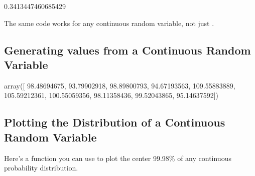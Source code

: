 \documentclass[letterpaper,10pt,english]{jupyterBook}
\begin{document}
\begin{sphinxVerbatim}[commandchars=\\\{\}]
0.3413447460685429
\end{sphinxVerbatim}

\sphinxAtStartPar
The same code works for any continuous random variable, not just .


\subsection{Generating values from a Continuous Random Variable}
\label{\detokenize{GB213-review-in-Python:generating-values-from-a-continuous-random-variable}}
\begin{sphinxVerbatim}[commandchars=\\\{\}]
    
\end{sphinxVerbatim}

\begin{sphinxVerbatim}[commandchars=\\\{\}]
array([ 98.48694675,  93.79902918,  98.89800793,  94.67193563,
       109.55883889, 105.59212361, 100.55059356,  98.11358436,
        99.52043865,  95.14637592])
\end{sphinxVerbatim}


\subsection{Plotting the Distribution of a Continuous Random Variable}
\label{\detokenize{GB213-review-in-Python:plotting-the-distribution-of-a-continuous-random-variable}}
\sphinxAtStartPar
Here’s a function you can use to plot the center 99.98\% of any continuous probability distribution.

\begin{sphinxVerbatim}[commandchars=\\\{\}]
    
            
          
        
       
\end{sphinxVerbatim}
\end{document}
